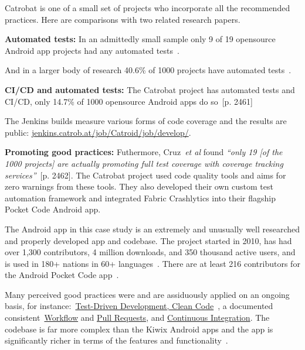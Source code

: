 \begin{kaobox}[frametitle=Ranking Catrobat's development practices]
Catrobat is one of a small set of projects who incorporate all the recommended practices. Here are comparisons with two related research papers.

\textbf{Automated tests:} In an admittedly small sample only 9 of 19 opensource Android app projects had any automated tests~. 

And in a larger body of research 40.6\% of 1000 projects have automated tests~. 

\textbf{CI/CD and automated tests:} 
The Catrobat project has automated tests and CI/CD, only 14.7\% of 1000 opensource Android apps do so~[p. 2461]~

The Jenkins builds measure various forms of code coverage and the results are public: \href{https://jenkins.catrob.at/job/Catroid/job/develop/}{jenkins.catrob.at/job/Catroid/job/develop/}.

\textbf{Promoting good practices:} 
Futhermore, Cruz~\emph{et al} found \emph{``only 19 [of the 1000 projects] are actually promoting full test coverage with coverage tracking services''}~[p. 2462]. The Catrobat project used code quality tools and aims for zero warnings from these tools. They also developed their own custom test automation framework and integrated Fabric Crashlytics into their flagship Pocket Code Android app.

\end{kaobox}


The Android app in this case study is an extremely and unusually well researched and properly developed app and codebase. The project started in 2010, has had over 1,300 contributors, 4 million downloads, and 350 thousand active users, and is used in 180+ nations in 60+ languages~. There are at least 216 contributors for the Android Pocket Code app~.

Many perceived good practices were and are assiduously applied on an ongoing basis, for instance:~\href{https://github.com/Catrobat/Catroid}{Test-Driven Development, Clean Code}~, a documented consistent~\href{https://github.com/Catrobat/Catroid/wiki/Workflow}{Workflow} and \href{https://github.com/Catrobat/Catroid/wiki/Creating-a-pull-request}{Pull Requests}, and \href{https://jenkins.catrob.at/job/Catroid/}{Continuous Integration}. The codebase is far more complex than the Kiwix Android apps and the app is significantly richer in terms of the features and functionality~.



